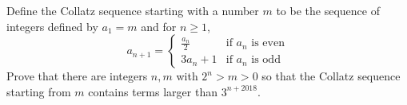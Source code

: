 Define the Collatz sequence starting with a number $m$ to be the sequence of integers defined by $a_1=m$ and for $n\geq1$, \[a_{n+1}=\begin{cases}\frac{a_n}{2} & \text{if $a_n$ is even}\\3a_n+1 & \text{if $a_n$ is odd}\end{cases}\] Prove that there are integers $n,m$ with $2^n>m>0$ so that the Collatz sequence starting from $m$ contains terms larger than $3^{n+2018}$.